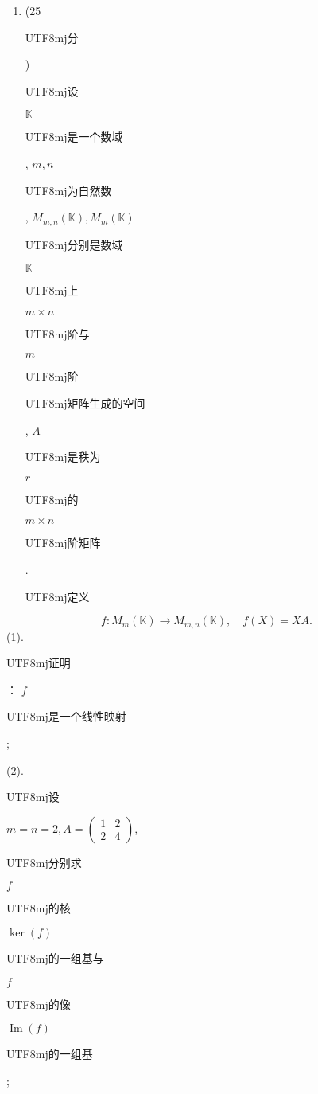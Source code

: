 \documentclass[10pt]{article}
\begin{document}
\begin{enumerate}
  \item (25 \begin{CJK}{UTF8}{mj}分\end{CJK}) \begin{CJK}{UTF8}{mj}设\end{CJK} $\mathbb{K}$ \begin{CJK}{UTF8}{mj}是一个数域\end{CJK}, $m, n$ \begin{CJK}{UTF8}{mj}为自然数\end{CJK}, $M_{m, n}(\mathbb{K}), M_{m}(\mathbb{K})$ \begin{CJK}{UTF8}{mj}分别是数域\end{CJK} $\mathbb{K}$ \begin{CJK}{UTF8}{mj}上\end{CJK} $m \times n$ \begin{CJK}{UTF8}{mj}阶与\end{CJK} $m$ \begin{CJK}{UTF8}{mj}阶\end{CJK} \begin{CJK}{UTF8}{mj}矩阵生成的空间\end{CJK}, $A$ \begin{CJK}{UTF8}{mj}是秩为\end{CJK} $r$ \begin{CJK}{UTF8}{mj}的\end{CJK} $m \times n$ \begin{CJK}{UTF8}{mj}阶矩阵\end{CJK}. \begin{CJK}{UTF8}{mj}定义\end{CJK}

\end{enumerate}
$$
f: M_{m}(\mathbb{K}) \rightarrow M_{m, n}(\mathbb{K}), \quad f(X)=X A .
$$
(1). \begin{CJK}{UTF8}{mj}证明\end{CJK}： $f$ \begin{CJK}{UTF8}{mj}是一个线性映射\end{CJK};

(2). \begin{CJK}{UTF8}{mj}设\end{CJK} $m=n=2, A=\left(\begin{array}{ll}1 & 2 \\ 2 & 4\end{array}\right)$, \begin{CJK}{UTF8}{mj}分别求\end{CJK} $f$ \begin{CJK}{UTF8}{mj}的核\end{CJK} $\operatorname{ker}(f)$ \begin{CJK}{UTF8}{mj}的一组基与\end{CJK} $f$ \begin{CJK}{UTF8}{mj}的像\end{CJK} $\operatorname{Im}(f)$ \begin{CJK}{UTF8}{mj}的一组基\end{CJK};
\end{document}
